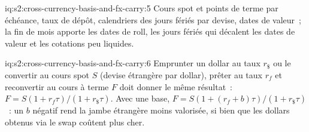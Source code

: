 \begin{solution}{iq:s2:cross-currency-basis-and-fx-carry:5}
Cours spot et points de terme par échéance, taux de dépôt, calendriers des jours fériés par devise, dates de valeur~; la fin de mois apporte les dates de roll, les jours fériés qui décalent les
dates de valeur et les cotations peu liquides.
\end{solution}

\begin{solution}{iq:s2:cross-currency-basis-and-fx-carry:6}
Emprunter un dollar au taux $r_\$$ ou le convertir au cours spot $S$ (devise étrangère par dollar), prêter au taux $r_f$ et reconvertir au cours à terme $F$ doit donner le même résultat~:
$F = S(1 + r_f\tau)/(1 + r_\$\tau)$. Avec une base, $F = S(1 + (r_f + b)\tau)/(1 + r_\$\tau)$~: un $b$ négatif rend la jambe étrangère moins valorisée, si bien que les dollars
obtenus via le swap coûtent plus cher.
\end{solution}

